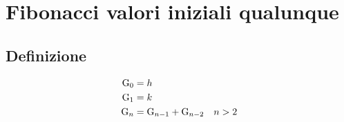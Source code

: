 \chapter{Fibonacci valori iniziali qualunque}
\section{Definizione}
\begin{defn}
	\begin{align}
		\mathrm{G}_{0}={}&h\notag\\
		\mathrm{G}_{1}={}&k\notag\\
		\mathrm{G}_{n}={}&\mathrm{G}_{n-1}+\mathrm{G}_{n-2}\quad n>2\label{eqn:FiboGendef}
	\end{align}
\end{defn}
